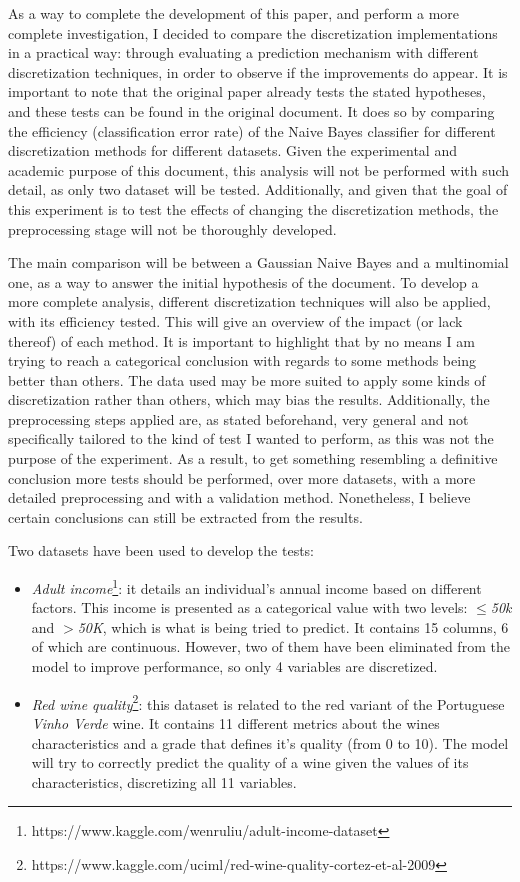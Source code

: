 \documentclass{article}
\begin{document}
As a way to complete the development of this paper, and perform a more complete investigation, I decided to compare the discretization implementations in a practical way: through evaluating a prediction mechanism with different discretization techniques, in order to observe if the improvements do appear. It is important to note that the original paper already tests the stated hypotheses, and these tests can be found in the original document. It does so by comparing the efficiency (classification error rate) of the Naive Bayes classifier for different discretization methods for different datasets. Given the experimental and academic purpose of this document, this analysis will not be performed with such detail, as only two dataset will be tested. Additionally, and given that the goal of this experiment is to test the effects of changing the discretization methods, the preprocessing stage will not be thoroughly developed. 

The main comparison will be between a Gaussian Naive Bayes and a multinomial one, as a way to answer the initial hypothesis of the document. To develop a more complete analysis, different discretization techniques will also be applied, with its efficiency tested. This will give an overview of the impact (or lack thereof) of each method. It is important to highlight that by no means I am trying to reach a categorical conclusion with regards to some methods being better than others. The data used may be more suited to apply some kinds of discretization rather than others, which may bias the results. Additionally, the preprocessing steps applied are, as stated beforehand, very general and not specifically tailored to the kind of test I wanted to perform, as this was not the purpose of the experiment. As a result, to get something resembling a definitive conclusion more tests should be performed, over more datasets, with a more detailed preprocessing and with a validation method. Nonetheless, I believe certain conclusions can still be extracted from the results.

Two datasets have been used to develop the tests:
\begin{itemize} 
    \item \emph{Adult income}\footnote{https://www.kaggle.com/wenruliu/adult-income-dataset}: it details an individual's annual income based on different factors. This income is presented as a categorical value with two levels: \emph{$\leq$50k} and \emph{$>$50K}, which is what is being tried to predict. It contains 15 columns, 6 of which are continuous. However, two of them have been eliminated from the model to improve performance, so only 4 variables are discretized.
    \item \emph{Red wine quality}\footnote{https://www.kaggle.com/uciml/red-wine-quality-cortez-et-al-2009}: this dataset is related to the red variant of the Portuguese \emph{Vinho Verde} wine. It contains 11 different metrics about the wines characteristics and a grade that defines it's quality (from 0 to 10). The model will try to correctly predict the quality of a wine given the values of its characteristics, discretizing all 11 variables.
\end{itemize} 
\end{document}

